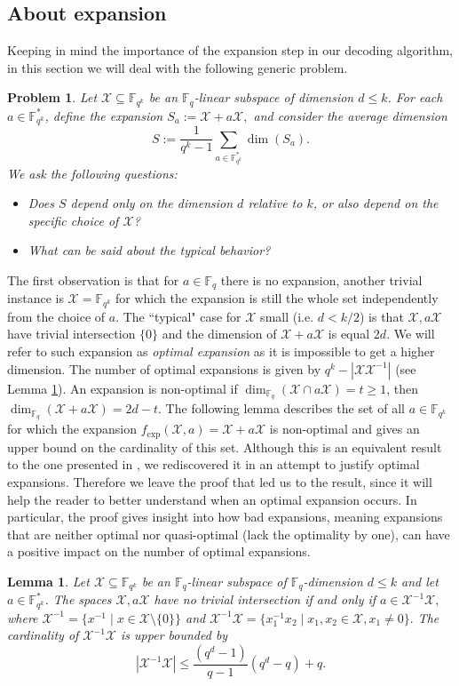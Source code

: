 \documentclass{article}
\newtheorem{lemma}{Lemma}
\newtheorem{problem}{Problem}
\newcommand{\Fq}{\mathbb{F}_{q}}
\newcommand{\Fqk}{\mathbb{F}_{q^k}}
\newcommand{\calX}{\mathcal{X}}
\newcommand{\fexp}{f_{\mathrm{exp}}}
\begin{document}
\subsection{About expansion}
\label{app: Expansion}
Keeping in mind the importance of the expansion step in our decoding algorithm, in this section we will deal with the following generic problem.
\begin{problem}
Let $\mathcal{X} \subseteq \mathbb{F}_{q^k}$ be an $\mathbb{F}_q$-linear subspace of dimension $d \le k$.
For each $a \in \Fqk^*$, define the expansion
$
S_a := \mathcal{X} + a\mathcal{X},
$
and consider the average dimension
\[
S := \frac{1}{q^k - 1} \sum_{a \in \Fqk^*} \dim(S_a).
\]
We ask the following questions:
\begin{itemize}
    \item Does $S$ depend only on the dimension $d$ relative to $k$, or also depend on the specific choice of $\mathcal{X}$?
    \item What can be said about the typical behavior?
\end{itemize}
\end{problem}
The first observation is that for $a \in \Fq$ there is no expansion, another trivial instance is $\calX = \Fqk$ for which the expansion is still the whole set independently from the choice of $a$.
The ``typical" case for $\calX$ small (i.e. $d < k/2$) is that $\calX, a \calX$ have trivial intersection $\{0\}$ and the dimension of $\calX +  a \calX$ is equal $2d.$
We will refer to such expansion as \textit{optimal expansion} as it is impossible to get a higher dimension.
The number of optimal expansions is given by $q^k  - |\calX \calX^{-1}|$ (see Lemma \ref{lm:XX_inv}).
An expansion is non-optimal if $\dim_{\Fq}(\calX \cap a \calX) = t \geq 1$, then $\dim_{\Fq}(\calX + a \calX) = 2d - t.$
The following lemma describes the set of all $a \in \Fqk$ for which the expansion $\fexp(\calX,a) = \calX + a \calX$ is non-optimal and gives an upper bound on the cardinality of this set. Although this is an equivalent result to the one presented in \cite[Proposition 3.4]{gluesing2021distance}, we rediscovered it in an attempt to justify optimal expansions. Therefore we leave the proof that led us to the result, since it will help the reader to better understand when an optimal expansion occurs. In particular, the proof gives insight into how bad expansions, meaning expansions that are neither optimal nor quasi-optimal (lack the optimality by one), can have a positive impact on the number of optimal expansions.
\begin{lemma}\label{lm:XX_inv}
    Let $\calX \subseteq \Fqk$ be an $\Fq$-linear subspace of $\Fq$-dimension $d \leq k$ and let $a \in \Fqk^*$. The spaces $\calX, a \calX$ have no trivial intersection if and only if $a \in \calX^{-1} \calX,$ where $\calX^{-1} = \{ x^{-1} \mid x \in \calX \setminus\{0\}\}$  and $\calX^{-1} \calX = \{x_1^{-1} x_2 \mid x_1,x_2 \in \calX, x_1 \neq 0\}.$ The cardinality of $\calX^{-1}\calX$ is upper bounded by 
    \begin{equation} \label{eq:XX_inv_size_bound}
    |\calX^{-1} \calX| \leq  \frac{(q^{d} - 1)}{q-1}(q^d - q)  + q.
\end{equation}

\end{lemma}
\end{document}
